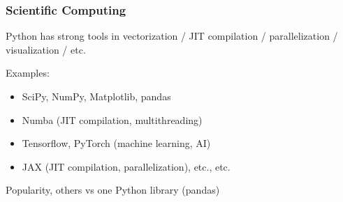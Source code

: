 \begin{frame}
    \frametitle{Scientific Computing}
    
    Python has strong tools in vectorization / JIT compilation /
    parallelization / visualization / etc.

    Examples:

    \begin{itemize}
        \item SciPy, NumPy, Matplotlib, pandas
            \vspace{0.5em}
        \item Numba (JIT compilation, multithreading)
            \vspace{0.5em}
        \item Tensorflow, PyTorch (machine learning, AI)
            \vspace{0.5em}
        \item JAX (JIT compilation, parallelization), etc., etc.
    \end{itemize}

\end{frame}

\begin{frame}
    

    Popularity, others vs one Python library (pandas)

    \begin{figure}
       \begin{center}
       \end{center}
    \end{figure}


\end{frame}








